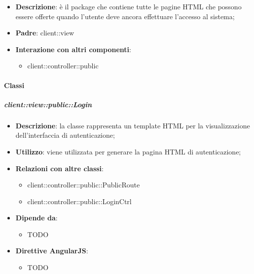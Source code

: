 \begin{itemize}
	\item \textbf{Descrizione}: è il package che contiene tutte le pagine HTML che possono essere offerte quando l'utente deve ancora effettuare l'accesso al sistema;
	\item \textbf{Padre}: client::view
	\item \textbf{Interazione con altri componenti}:
		\begin{itemize}
			\item client::controller::public
		\end{itemize}
\end{itemize}

	\paragraph{Classi} %
		\subparagraph{client::view::public::Login} %
		\label{subp:bdsm_app_client_view_public_login}

			\begin{itemize}
				\item \textbf{Descrizione}: la classe rappresenta un template HTML per la visualizzazione dell'interfaccia di autenticazione;
				\item \textbf{Utilizzo}: viene utilizzata per generare la pagina HTML di autenticazione;
				\item \textbf{Relazioni con altre classi}:
					\begin{itemize}
						\item client::controller::public::PublicRoute
						\item client::controller::public::LoginCtrl
					\end{itemize}
				\item \textbf{Dipende da}:
					\begin{itemize}
						\item TODO
					\end{itemize}
				\item \textbf{Direttive AngularJS}:
					\begin{itemize}
						\item TODO
					\end{itemize}
			\end{itemize}

